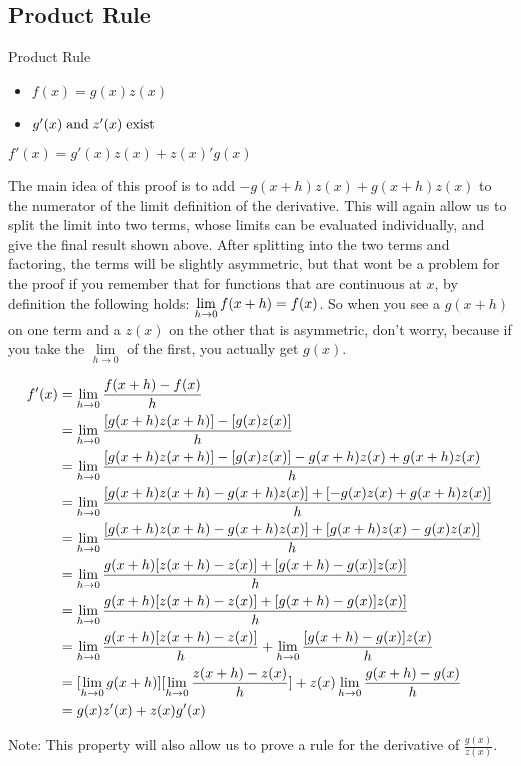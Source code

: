 \subsection{Product Rule}
\begin{property}{Product Rule}
\begin{precondition}
    \begin{itemize}
      \item $f(x)=g(x) z(x)$
      \item $g'(x) \; \text{and} \; z'(x) \; \text{exist} \;$
    \end{itemize}
  \end{precondition}
\begin{claim}
    $f'(x)=g'(x) z(x) + z(x)' g(x)$
\end{claim}
\begin{Proof}
The main idea of this proof is to add $- g(x+h) z(x) + g(x+h) z(x)$ to the numerator of the limit definition of the derivative. This will again allow us to split the limit into two terms, whose limits can be evaluated individually, and give the final result shown above.
After splitting into the two terms and factoring, the terms will be slightly asymmetric, but that wont be a problem for the proof if you remember that for functions that are continuous at $x$, by definition the following holds: $\lim\limits_{h \rightarrow 0} f(x+h)=f(x)$.
So when you see a $g(x+h)$ on one term and a $z(x)$ on the other that is asymmetric, don't worry,
because if you take the $\lim\limits_{h \rightarrow 0}$ of the first, you actually get $g(x)$.

\begin{align*}
f'(x)&=\lim\limits_{h \rightarrow 0}  \frac{f(x+h)-f(x)}{h}
\\&= \lim\limits_{h \rightarrow 0}  \frac{ [g(x+h)  z(x+h) ] - [g(x) z(x)]}{h}
\\&= \lim\limits_{h \rightarrow 0}  \frac{ [g(x+h)  z(x+h) ] - [g(x) z(x)] - g(x+h) z(x) + g(x+h) z(x) }{h}
\\&= \lim\limits_{h \rightarrow 0}  \frac{ [g(x+h)  z(x+h) - g(x+h) z(x) ] + [ - g(x) z(x) + g(x+h) z(x)]  }{h}
\\&= \lim\limits_{h \rightarrow 0}  \frac{ [g(x+h)  z(x+h) - g(x+h) z(x) ] + [  g(x+h) z(x) - g(x) z(x)]  }{h}
\\&= \lim\limits_{h \rightarrow 0}  \frac{ g(x+h)  [z(x+h) - z(x) ] +   [g(x+h) - g(x)] z(x)]  }{h}
\\&= \lim\limits_{h \rightarrow 0}  \frac{ g(x+h)  [z(x+h) - z(x) ] +   [g(x+h) - g(x)] z(x)]  }{h}
\\&= \lim\limits_{h \rightarrow 0}  \frac{ g(x+h)  [z(x+h) - z(x) ]}{h} +  \lim\limits_{h \rightarrow 0}  \frac{  [g(x+h) - g(x)] z(x) }{h}
\\&= [\lim\limits_{h \rightarrow 0} g(x+h)] [\lim\limits_{h \rightarrow 0}  \frac{ z(x+h) - z(x) }{h} ] + z(x) \lim\limits_{h \rightarrow 0}  \frac{  g(x+h) - g(x)}{h}
\\&= g(x)  z'(x) + z(x) g'(x)
\end{align*}

Note: This property will also allow us to prove a rule for the derivative of $\frac{g(x)}{z(x)}$.
\end{Proof}
\end{property}


